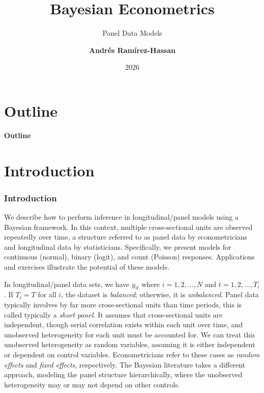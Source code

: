\documentclass[12pt, compress]{beamer}
\title{Bayesian Econometrics}
\subtitle{Panel Data Models}
\date{2026}
\author[Andr\'e Ram\'irez H.]{\textbf{Andr\'es Ram\'irez-Hassan}}
\institute[EAFIT]{\small{Universidad EAFIT\\School of Finance, Economics and Government}}
\begin{document}
	
	\maketitle
	
	
	
	
	\section*{Outline}
	\begin{frame}
		\textbf{\Large{Outline}}
		\tableofcontents
	\end{frame}
	
\section{Introduction}
	
\begin{frame}
	\frametitle{Introduction}
We describe how to perform inference in longitudinal/panel models using a Bayesian framework. In this context, multiple cross-sectional units are observed repeatedly over time, a structure referred to as panel data by econometricians and longitudinal data by statisticians. Specifically, we present models for continuous (normal), binary (logit), and count (Poisson) responses. Applications and exercises illustrate the potential of these models.

In longitudinal/panel data sets, we have $y_{it}$ where $i=1,2,\dots,N$ and $t=1,2,\dots,T_i$. If $T_i=T$ for all $i$, the dataset is \textit{balanced}; otherwise, it is \textit{unbalanced}. Panel data typically involves by far more cross-sectional units than time periods, this is called typically a \textit{short panel}. It assumes that cross-sectional units are independent, though serial correlation exists within each unit over time, and unobserved heterogeneity for each unit must be accounted for. We can treat this unobserved heterogeneity as random variables, assuming it is either independent or dependent on control variables. Econometricians refer to these cases as \textit{random effects} and \textit{fixed effects}, respectively. The Bayesian literature takes a different approach, modeling the panel structure hierarchically, where the unobserved heterogeneity may or may not depend on other controls.
\end{frame}
\end{document}
